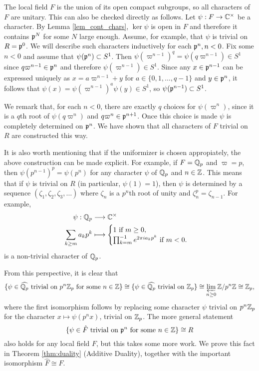 \begin{example}
    The local field $F$ is the union of its open compact subgroups, so all characters of $F$ are unitary. This can also be checked directly as follows. Let $\psi:F\to\mathbb{C}^\times$ be a character. By Lemma \ref{lem_cont_chars}, $\ker\psi$ is open in $F$ and therefore it contains $\mathfrak{p}^N$ for some $N$ large enough. Assume, for example, that $\psi$ is trivial on $R=\mathfrak{p}^0$. We will describe such characters inductively for each $\mathfrak{p}^n, n<0$. Fix some $n<0$ and assume that $\psi(\mathfrak{p}^n)\subset S^1$. Then $\psi(\varpi^{n-1})^q=\psi(q\varpi^{n-1})\in S^1$ since $q\varpi^{n-1}\in\mathfrak{p}^n$ and therefore $\psi(\varpi^{n-1})\in S^1$. Since any $x\in\mathfrak{p}^{n-1}$ can be expressed uniquely as $x=a\varpi^{n-1}+y$ for $a\in\{0,1,\ldots,q-1\}$ and $y\in \mathfrak{p}^n$, it follows that $\psi(x)=\psi(\varpi^{n-1})^a\psi(y)\in S^{1}$, so $\psi(\mathfrak{p}^{n-1})\subset S^1$.
    
    
    We remark that, for each $n<0$, there are exactly $q$ choices for $\psi(\varpi^n)$, since it is a $q$th root of $\psi(q\varpi^{n})$ and $q\varpi^{n}\in\mathfrak{p}^{n+1}$. Once this choice is made $\psi$ is completely determined on $\mathfrak{p}^n$. We have shown that all characters of $F$ trivial on $R$ are constructed this way.

    It is also worth mentioning that if the uniformizer is chosen appropiately, the above construction can be made explicit. For example, if $F=\mathbb{Q}_p$ and $\varpi=p$, then $\psi(p^{n-1})^p=\psi(p^{n})$ for any character $\psi$ of $\mathbb{Q}_p$ and $n\in\mathbb{Z}$. This means that if $\psi$ is trivial on $R$ (in particular, $\psi(1)=1$), then $\psi$ is determined by a sequence $(\zeta_1,\zeta_2,\zeta_3,\ldots)$ where $\zeta_n$ is a $p^n$th root of unity and $\zeta_n^p=\zeta_{n-1}$. For example,
    \begin{align*}
        \psi:\mathbb{Q}_p&\longrightarrow \mathbb{C}^\times\\
        \sum_{k\geq m} a_kp^k&\longmapsto
        \begin{cases}
            1 \text{ if } m\geq 0,\\
            \prod_{k=m}^{-1}e^{2\pi i a_kp^k} \text{ if } m < 0.\\
        \end{cases}
    \end{align*}
    is a non-trivial character of $\mathbb{Q}_p$.
    
    
    From this perspective, it is clear that
    $$\{\psi\in\widehat{\mathbb{Q}_p}\text{ trivial on } p^n\mathbb{Z}_p \text{ for some }n\in\mathbb{Z} \}\cong\{\psi\in\widehat{\mathbb{Q}_p}\text{ trivial on } \mathbb{Z}_p \}\cong \varprojlim_{n\geq 0} \mathbb{Z}/p^n\mathbb{Z}\cong \mathbb{Z}_p,$$
    where the first isomorphism follows by replacing some character $\psi$ trivial on $p^n\mathbb{Z}_p$ for the character $x\mapsto\psi(p^n x)$, trivial on $\mathbb{Z}_p$. The more general statement 
    $$\{\psi\in\hat{F}\text{ trivial on } \mathfrak{p}^n \text{ for some }n\in\mathbb{Z} \}\cong R$$
    also holds for any local field $F$, but this takes some more work. We prove this fact in Theorem \ref{thm:duality} (Additive Duality), together with the important isomorphism $\hat{F}\cong F$.

\end{example}

